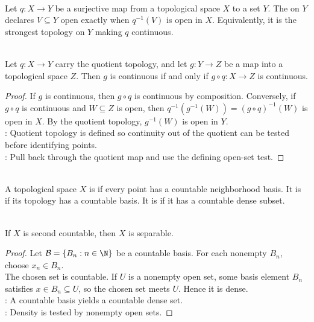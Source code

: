 \begin{definition} \label{def:quotient-topology} \\
Let $q:X\to Y$ be a surjective map from a topological space $X$ to a set $Y$. The  on $Y$ declares $V\subseteq Y$ open exactly when $q^{-1}(V)$ is open in $X$. Equivalently, it is the strongest topology on $Y$ making $q$ continuous.
\end{definition}

\begin{proposition} \label{prop:quotient-topology-universal-property} \\
Let $q:X\to Y$ carry the quotient topology, and let $g:Y\to Z$ be a map into a topological space $Z$. Then $g$ is continuous if and only if $g\circ q:X\to Z$ is continuous.
\begin{proof}
If $g$ is continuous, then $g\circ q$ is continuous by composition. Conversely, if $g\circ q$ is continuous and $W\subseteq Z$ is open, then $q^{-1}(g^{-1}(W))=(g\circ q)^{-1}(W)$ is open in $X$. By the quotient topology, $g^{-1}(W)$ is open in $Y$.\\
: Quotient topology is defined so continuity out of the quotient can be tested before identifying points.\\
: Pull back through the quotient map and use the defining open-set test.
\end{proof}
\end{proposition}

\begin{definition} \label{def:topological-countability-axioms} \\
A topological space $X$ is  if every point has a countable neighborhood basis. It is  if its topology has a countable basis. It is  if it has a countable dense subset.
\end{definition}

\begin{proposition} \label{prop:second-countable-implies-separable} \\
If $X$ is second countable, then $X$ is separable.
\begin{proof}
Let $\mathcal{B}=\{B_n:n\in\N\}$ be a countable basis. For each nonempty $B_n$, choose $x_n\in B_n$.\\
The chosen set is countable. If $U$ is a nonempty open set, some basis element $B_n$ satisfies $x\in B_n\subseteq U$, so the chosen set meets $U$. Hence it is dense.\\
: A countable basis yields a countable dense set.\\
: Density is tested by nonempty open sets.
\end{proof}
\end{proposition}
